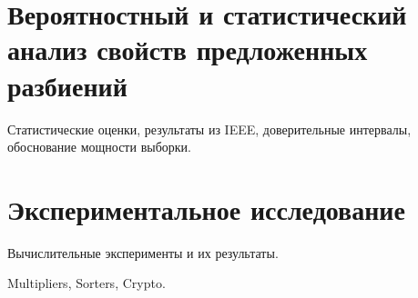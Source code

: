 
\section{Вероятностный и статистический анализ свойств предложенных разбиений}

Статистические оценки, результаты из IEEE, доверительные интервалы, обоснование мощности выборки.

\section{Экспериментальное исследование}

Вычислительные эксперименты и их результаты.

Multipliers, Sorters, Crypto.
